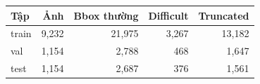\begin{tabular}{lrrrr}
\toprule
Tập & Ảnh & Bbox thường & Difficult & Truncated\\
\midrule
train & 9,232 & 21,975 & 3,267 & 13,182\\
val & 1,154 & 2,788 & 468 & 1,647\\
test & 1,154 & 2,687 & 376 & 1,561\\
\bottomrule
\end{tabular}
